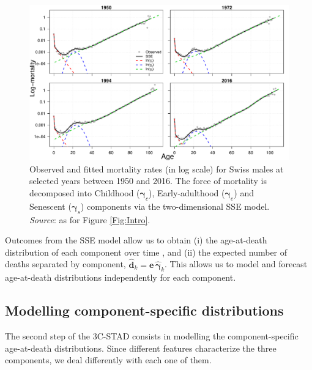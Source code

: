 \documentclass[11pt, a4paper]{article}
\begin{document}
\begin{figure}[t]
	\begin{center}
		\includegraphics[scale=0.62]{./Figures/F2.pdf}
		\caption{Observed and fitted mortality rates (in log scale) for Swiss males at selected years between 1950 and 2016. The force of mortality is decomposed into Childhood ($\bm{\gamma}_c$), Early-adulthood ($\bm{\gamma}_e$) and Senescent ($\bm{\gamma}_s$) components via the two-dimensional SSE model.\\\footnotesize{\textit{Source}: as for Figure \ref{Fig:Intro}.} \label{Fig:SSEexample}}		
	\end{center}
\end{figure}

Outcomes from the SSE model allow us to obtain (i) the age-at-death distribution of each component over time \cite[using standard life-table construction,][]{preston2001demogr}, and (ii) the expected number of deaths separated by component, $\hat{\bm{d}}_k=\bm{e}\,\hat{\bm{\gamma}}_k$. This allows us to model and forecast age-at-death distributions independently for each component. 


\subsection{Modelling component-specific distributions}\label{Subsec:STADbyComp}

The second step of the 3C-STAD consists in modelling the component-specific age-at-death distributions. Since different features characterize the three components, we deal differently with each one of them. 
\end{document}
